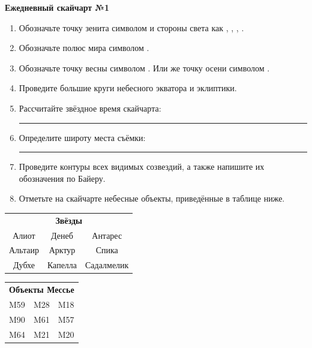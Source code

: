 \documentclass{./SAS-class-skygen}
\begin{document}
    
    
    
	\begin{center}
		\large\textbf{Ежедневный скайчарт №1}
	\end{center}

	\begin{enumerate}
		\item Обозначьте точку зенита символом  и стороны света как , , , .
		\item Обозначьте полюс мира символом .
		\item Обозначьте точку весны символом \Aries. Или же точку осени символом \Libra.
		\item Проведите большие круги небесного экватора и эклиптики.
		\item Рассчитайте звёздное время скайчарта: \rule{2cm}{0.4pt}
		\item Определите широту места съёмки: \rule{2cm}{0.4pt}
		\item Проведите контуры всех видимых созвездий, а также напишите их обозначения по Байеру.
		\item Отметьте на скайчарте небесные объекты, приведённые в таблице ниже.
	\end{enumerate}
	
    \vspace{0.5cm}

    \begin{table}[h!]
    \centering
    \begin{tabular}{ccc}
    \multicolumn{3}{c}{\textbf{Звёзды}} \\ Алиот & Денеб & Антарес \\
Альтаир & Арктур & Спика \\
Дубхе & Капелла & Садалмелик \\

\end{tabular}
    \hfill
    \begin{tabular}{ccc}
    \multicolumn{3}{c}{\textbf{Объекты Мессье}} \\ M59 & M28 & M18 \\
M90 & M61 & M57 \\
M64 & M21 & M20 \\

\end{tabular}
    \end{table}
	
\end{document}
